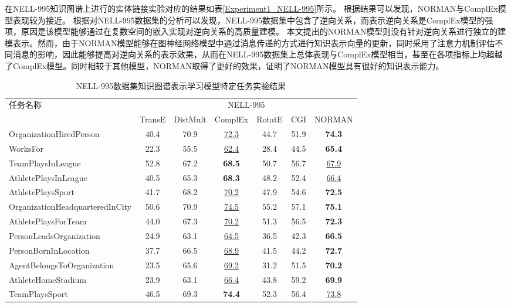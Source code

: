 \documentclass[algorithmlist, AutoFakeBold, AutoFakeSlant, figurelist, tablelist, nomlist, engineering, openany]{seuthesix} %
\begin{document}
在NELL-995知识图谱上进行的实体链接实验对应的结果如表\ref{Experiment1_NELL-995}所示。
根据结果可以发现，NORMAN与ComplEx模型表现较为接近。
根据对NELL-995数据集的分析可以发现，NELL-995数据集中包含了逆向关系，而表示逆向关系是ComplEx模型的强项，原因是该模型能够通过在复数空间的嵌入实现对逆向关系的高质量建模。
本文提出的NORMAN模型则没有针对逆向关系进行独立的建模表示。然而，由于NORMAN模型能够在图神经网络模型中通过消息传递的方式进行知识表示向量的更新，同时采用了注意力机制评估不同消息的影响，因此能够提高对逆向关系的表示效果，从而在NELL-995数据集上总体表现与ComplEx模型相当，甚至在各项指标上均超越了ComplEx模型。同时相较于其他模型，NORMAN取得了更好的效果，证明了NORMAN模型具有很好的知识表示能力。

\begin{table}[t]
  \centering
  \caption{NELL-995数据集知识图谱表示学习模型特定任务实验结果}
  \begin{tabular*}{0.95\textwidth}{@{\extracolsep{\fill}}lcccccc}
    \toprule[1pt]
    \multirow{2}{*}{\small{任务名称}} & \multicolumn{6}{c}{\small{NELL-995}} \\
      & \small{TransE} & \small{DistMult} & \small{ComplEx} & \small{RotatE} & \small{CGI} & \small{NORMAN} \\ \hline
    \small{OrganizationHiredPerson} & 40.4 & 70.9 & \underline{72.3} & 44.7 & 51.9 & \textbf{74.3} \\
    \small{WorksFor} & 22.3 & 55.5 & \underline{62.4} & 28.4 & 44.5 & \textbf{65.4} \\
    \small{TeamPlaysInLeague} & 52.8 & 67.2 & \textbf{68.5} & 50.7 & 56.7 & \underline{67.9} \\
    \small{AthletePlaysInLeague} & 40.5 & 65.3 & \textbf{68.3} & 48.2 & 52.4 & \underline{66.4} \\
    \small{AthletePlaysSport} & 41.7 & 68.2 & \underline{70.2} & 47.9 & 54.6 & \textbf{72.5} \\
    \small{OrganizationHeadquarteredInCity} & 50.6 & 70.9 & \underline{74.5} & 55.2 & 57.1 & \textbf{75.1} \\
    \small{AthletePlaysForTeam} & 44.0 & 67.3 & \underline{70.2} & 51.3 & 56.5 & \textbf{72.3} \\
    \small{PersonLeadsOrganization} & 24.9 & 63.1 & \underline{64.5} & 36.5 & 42.3 & \textbf{66.5} \\
    \small{PersonBornInLocation} & 37.7 & 66.5 & \underline{68.9} & 41.5 & 44.2 & \textbf{72.7} \\
    \small{AgentBelongsToOrganization} & 23.5 & 65.6 & \underline{69.2} & 31.2 & 51.5 & \textbf{70.2} \\
    \small{AthleteHomeStadium} & 23.9 & 63.1 & \underline{66.4} & 43.8 & 59.2 & \textbf{69.9} \\
    \small{TeamPlaysSport} & 46.5 & 69.3 & \textbf{74.4} & 52.3 & 56.4 & \underline{73.8} \\
    \bottomrule[1pt]
  \end{tabular*}
  \label{Experiment1_tasks1}
\end{table}
\end{document}
